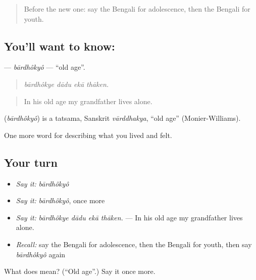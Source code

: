 \begin{quote}
Before the new one: say the Bengali for adolescence, then the Bengali for youth.
\end{quote}

\subsection*{You'll want to know: }
\textbf{} — \emph{bārdhôkyô} — \textquotedblleft{}old age\textquotedblright{}.

\begin{quote}
   
\end{quote}

\begin{quote}
\emph{bārdhôkye dādu ekā thāken.}
\end{quote}

\begin{quote}
In his old age my grandfather lives alone.
\end{quote}

\begin{cousinweb}
\textbf{} (\emph{bārdhôkyô}) is a tatsama, Sanskrit \emph{vārddhakya}, \textquotedblleft{}old age\textquotedblright{} (Monier-Williams).
\end{cousinweb}

\begin{grammarlens}[title={What you've built}]
One more word for describing what you lived and felt.
\end{grammarlens}

\subsection*{Your turn}
\begin{itemize}
\raggedright
  \item \emph{Say it:} \emph{bārdhôkyô}
  \item \emph{Say it:} \emph{bārdhôkyô}, once more
  \item \emph{Say it:} \emph{bārdhôkye dādu ekā thāken.} — In his old age my grandfather lives alone.
  \item \emph{Recall:} say the Bengali for adolescence, then the Bengali for youth, then say \emph{bārdhôkyô} again
\end{itemize}

\begin{tcolorbox}[breakable,colback=teal!4,colframe=teal!35!black,title={Before you move on}]
What does  mean? (\textquotedblleft{}Old age\textquotedblright{}.) Say it once more.
\end{tcolorbox}
